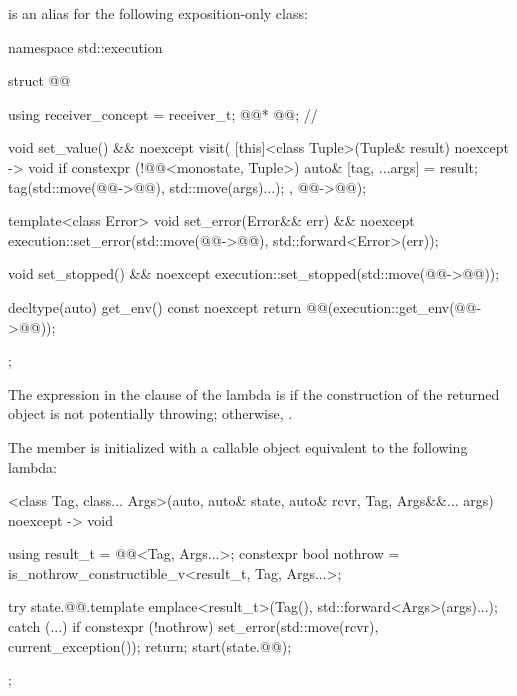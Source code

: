 \pnum
{} is an alias for the following exposition-only class:
\begin{codeblock}
namespace std::execution {
  struct @@ {
    using receiver_concept = receiver_t;
    @@* @@;          // \expos

    void set_value() && noexcept {
      visit(
        [this]<class Tuple>(Tuple& result) noexcept -> void {
          if constexpr (!@@<monostate, Tuple>) {
            auto& [tag, ...args] = result;
            tag(std::move(@@->@@), std::move(args)...);
          }
        },
        @@->@@);
    }

    template<class Error>
    void set_error(Error&& err) && noexcept {
      execution::set_error(std::move(@@->@@), std::forward<Error>(err));
    }

    void set_stopped() && noexcept {
      execution::set_stopped(std::move(@@->@@));
    }

    decltype(auto) get_env() const noexcept {
      return @@(execution::get_env(@@->@@));
    }
  };
}
\end{codeblock}

\pnum
The expression in the  clause of the lambda is 
if the construction of the returned  object
is not potentially throwing;
otherwise, .

\pnum
The member 
is initialized with a callable object equivalent to the following lambda:
\begin{codeblock}
[]<class Tag, class... Args>(auto, auto& state, auto& rcvr, Tag, Args&&... args) noexcept
    -> void {
  using result_t = @@<Tag, Args...>;
  constexpr bool nothrow = is_nothrow_constructible_v<result_t, Tag, Args...>;

  try {
    state.@@.template emplace<result_t>(Tag(), std::forward<Args>(args)...);
  } catch (...) {
    if constexpr (!nothrow) {
      set_error(std::move(rcvr), current_exception());
      return;
    }
  }
  start(state.@@);
};
\end{codeblock}

